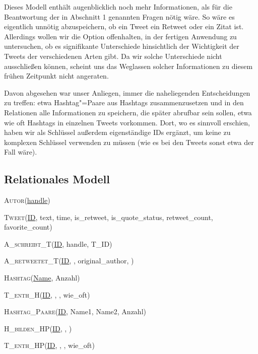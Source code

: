 \documentclass[BCOR0mm,fontsize=12pt,paper=a4,final,numbers=noenddot]{scrartcl}
\begin{document}
\noindent{}Dieses Modell enthält augenblicklich noch mehr Informationen, als für die Beantwortung der in Abschnitt 1 genannten Fragen nötig wäre. So wäre es eigentlich unnötig abzuspeichern, ob ein Tweet ein Retweet oder ein Zitat ist. Allerdings wollen wir die Option offenhalten, in der fertigen Anwendung zu untersuchen, ob es signifikante Unterschiede hinsichtlich der Wichtigkeit der Tweets der verschiedenen Arten gibt. Da wir solche Unterschiede nicht ausschließen können, scheint uns das Weglassen solcher Informationen zu diesem frühen Zeitpunkt nicht angeraten.

Davon abgesehen war unser Anliegen, immer die naheliegenden Entscheidungen zu treffen: etwa Hashtag"=Paare aus Hashtags zusammenzusetzen und in den Relationen alle Informationen zu speichern, die später abrufbar sein sollen, etwa wie oft Hashtags in einzelnen Tweets vorkommen. Dort, wo es sinnvoll erschien, haben wir als Schlüssel außerdem eigenständige IDs ergänzt, um keine zu komplexen Schlüssel verwenden zu müssen (wie es bei den Tweets sonst etwa der Fall wäre).


\subsection{Relationales Modell}

\textsc{Autor}(\uline{handle})

\noindent\textsc{Tweet}(\uline{ID}, text, time, is\_retweet, is\_quote\_status, retweet\_count, favorite\_count)

\noindent\textsc{A\_schreibt\_T}(\uline{ID}, handle, T\_ID)

\noindent\textsc{A\_retweetet\_T}(\uline{ID}, , original\_author, )

\noindent\textsc{Hashtag}(\uline{Name}, Anzahl)

\noindent\textsc{T\_enth\_H}(\uline{ID}, , , wie\_oft)

\noindent\textsc{Hashtag\_Paare}(\uline{ID}, Name1, Name2, Anzahl)

\noindent\textsc{H\_bilden\_HP}(\uline{ID}, , )

\noindent\textsc{T\_enth\_HP}(\uline{ID}, , , wie\_oft)
\end{document}
